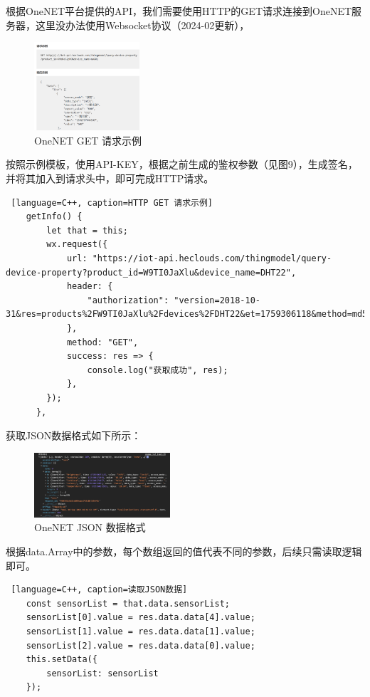 根据OneNET平台提供的API，我们需要使用HTTP的GET请求连接到OneNET服务器，这里没办法使用Websocket协议（2024-02更新），

\begin{figure} [H]
    \centering
    \includegraphics[width=0.35\textwidth]{img/GetMQTTDataHTTPGetExample.png}
    \caption{OneNET GET 请求示例}
    \label{fig:HTTP GET Example}
\end{figure}

按照示例模板，使用API-KEY，根据之前生成的鉴权参数（见图9），生成签名，并将其加入到请求头中，即可完成HTTP请求。

\begin{lstlisting} [language=C++, caption=HTTP GET 请求示例]
    getInfo() {
		let that = this;
		wx.request({
			url: "https://iot-api.heclouds.com/thingmodel/query-device-property?product_id=W9TI0JaXlu&device_name=DHT22",
			header: {
				"authorization": "version=2018-10-31&res=products%2FW9TI0JaXlu%2Fdevices%2FDHT22&et=1759306118&method=md5&sign=JRsZv0peZQOTmr7Eg8lGJg%3D%3D"
			},
			method: "GET",
			success: res => {
				console.log("获取成功", res);
            },
		});
	  },
\end{lstlisting}

获取JSON数据格式如下所示：

\begin{figure} [H]
    \centering
    \includegraphics[width=0.45\textwidth]{img/GetMQTTJSON.png}
    \caption{OneNET JSON 数据格式}
    \label{fig:GetMQTTJSON}
\end{figure}

根据data.Array中的参数，每个数组返回的值代表不同的参数，后续只需读取逻辑即可。

\begin{lstlisting} [language=C++, caption=读取JSON数据]
    const sensorList = that.data.sensorList;
    sensorList[0].value = res.data.data[4].value;
    sensorList[1].value = res.data.data[1].value;
    sensorList[2].value = res.data.data[0].value;
    this.setData({
        sensorList: sensorList
    });
\end{lstlisting}

